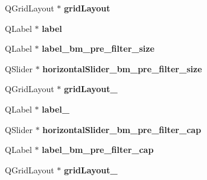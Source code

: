 \begin{DoxyCompactItemize}
\item 
\hypertarget{class_ui__stereo_match_param_form_a8452afd4c52b464d5ed7cdb4e44e6998}{}Q\+Grid\+Layout $\ast$ {\bfseries grid\+Layout}\label{class_ui__stereo_match_param_form_a8452afd4c52b464d5ed7cdb4e44e6998}

\item 
\hypertarget{class_ui__stereo_match_param_form_a5806afaf8e653668090d45861e17f588}{}Q\+Label $\ast$ {\bfseries label}\label{class_ui__stereo_match_param_form_a5806afaf8e653668090d45861e17f588}

\item 
\hypertarget{class_ui__stereo_match_param_form_a8329f439001e88a6688bc2d7a8b39343}{}Q\+Label $\ast$ {\bfseries label\+\_\+bm\+\_\+pre\+\_\+filter\+\_\+size}\label{class_ui__stereo_match_param_form_a8329f439001e88a6688bc2d7a8b39343}

\item 
\hypertarget{class_ui__stereo_match_param_form_a587a5f93cd6e4de4da3e8d0d191b2d1d}{}Q\+Slider $\ast$ {\bfseries horizontal\+Slider\+\_\+bm\+\_\+pre\+\_\+filter\+\_\+size}\label{class_ui__stereo_match_param_form_a587a5f93cd6e4de4da3e8d0d191b2d1d}

\item 
\hypertarget{class_ui__stereo_match_param_form_a2658fceb42fc0c4a923fc97d3e5e4022}{}Q\+Grid\+Layout $\ast$ {\bfseries grid\+Layout\+\_}\label{class_ui__stereo_match_param_form_a2658fceb42fc0c4a923fc97d3e5e4022}

\item 
\hypertarget{class_ui__stereo_match_param_form_a6572935fd423dc1a6bd7596d63e2a832}{}Q\+Label $\ast$ {\bfseries label\+\_}\label{class_ui__stereo_match_param_form_a6572935fd423dc1a6bd7596d63e2a832}

\item 
\hypertarget{class_ui__stereo_match_param_form_af0e2b3488e0516b0ae49764e799fa0c4}{}Q\+Slider $\ast$ {\bfseries horizontal\+Slider\+\_\+bm\+\_\+pre\+\_\+filter\+\_\+cap}\label{class_ui__stereo_match_param_form_af0e2b3488e0516b0ae49764e799fa0c4}

\item 
\hypertarget{class_ui__stereo_match_param_form_a65529ef56665495a3207afad4027da91}{}Q\+Label $\ast$ {\bfseries label\+\_\+bm\+\_\+pre\+\_\+filter\+\_\+cap}\label{class_ui__stereo_match_param_form_a65529ef56665495a3207afad4027da91}

\item 
\hypertarget{class_ui__stereo_match_param_form_ad1e1edd9fdae71ec506c07150f73e912}{}Q\+Grid\+Layout $\ast$ {\bfseries grid\+Layout\+\_}\label{class_ui__stereo_match_param_form_ad1e1edd9fdae71ec506c07150f73e912}


\end{DoxyCompactItemize}
